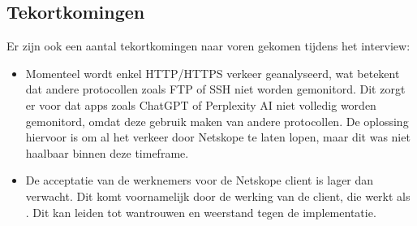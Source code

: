 \subsection{Tekortkomingen}
Er zijn ook een aantal tekortkomingen naar voren gekomen tijdens het interview:
\begin{itemize}
    \item Momenteel wordt enkel HTTP/HTTPS verkeer geanalyseerd, wat betekent dat andere protocollen zoals FTP of SSH niet worden gemonitord. Dit zorgt er voor dat apps zoals ChatGPT of Perplexity AI niet volledig worden gemonitord, omdat deze gebruik maken van andere protocollen. De oplossing hiervoor is om al het verkeer door Netskope te laten lopen, maar dit was niet haalbaar binnen deze timeframe.
    \item De acceptatie van de werknemers voor de Netskope client is lager dan verwacht. Dit komt voornamelijk door de werking van de client, die werkt als . Dit kan leiden tot wantrouwen en weerstand tegen de implementatie.
\end{itemize}